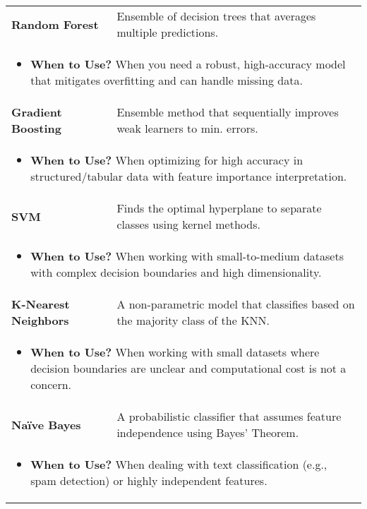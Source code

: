 \documentclass{article}
\begin{document}
\begin{summary}
\begin{center}
\begin{tabular}{ll}
        \midrule
        \textbf{Random Forest} & Ensemble of decision trees that averages multiple predictions. \\
        \multicolumn{2}{p{\linewidth}}{
        \begin{itemize}
            \item \textbf{When to Use?} When you need a robust, high-accuracy model that mitigates overfitting and can handle missing data.
        \end{itemize}} \\
        \midrule
        \textbf{Gradient Boosting} & Ensemble method that sequentially improves weak learners to min. errors. \\
        \multicolumn{2}{p{\linewidth}}{
        \begin{itemize}
            \item \textbf{When to Use?} When optimizing for high accuracy in structured/tabular data with feature importance interpretation.
        \end{itemize}} \\
        \midrule
        \textbf{SVM} & Finds the optimal hyperplane to separate classes using kernel methods. \\
        \multicolumn{2}{p{\linewidth}}{
        \begin{itemize}
            \item \textbf{When to Use?} When working with small-to-medium datasets with complex decision boundaries and high dimensionality.
        \end{itemize}} \\
        \midrule
        \textbf{K-Nearest Neighbors} & A non-parametric model that classifies based on the majority class of the KNN. \\
        \multicolumn{2}{p{\linewidth}}{
        \begin{itemize}
            \item \textbf{When to Use?} When working with small datasets where decision boundaries are unclear and computational cost is not a concern.
        \end{itemize}} \\
        \midrule
        \textbf{Naïve Bayes} & A probabilistic classifier that assumes feature independence using Bayes’ Theorem. \\
        \multicolumn{2}{p{\linewidth}}{
        \begin{itemize}
            \item \textbf{When to Use?} When dealing with text classification (e.g., spam detection) or highly independent features.
        \end{itemize}} \\
        \bottomrule
        \end{tabular}
    \end{center}
\end{summary}
\newpage
\end{document}
